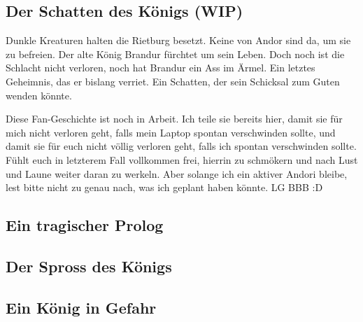 \begin{chapterbox}
    \chapter{Der Schatten des Königs (WIP)}
    \label{wip-der-schatten-des-koenigs}
    
    Dunkle Kreaturen halten die Rietburg besetzt. Keine  von Andor sind da, um sie zu befreien. Der alte König Brandur fürchtet um sein Leben. Doch noch ist die Schlacht nicht verloren, noch hat Brandur ein Ass im Ärmel. Ein letztes Geheimnis, das er bislang  verriet. Ein Schatten, der sein Schicksal zum Guten wenden könnte.
\end{chapterbox}



Diese Fan-Geschichte ist noch in Arbeit. Ich teile sie bereits hier, damit sie für mich nicht verloren geht, falls mein Laptop spontan verschwinden sollte, und damit sie für euch nicht völlig verloren geht, falls ich spontan verschwinden sollte. Fühlt euch in letzterem Fall vollkommen frei, hierrin zu schmökern und nach Lust und Laune weiter daran zu werkeln. Aber solange ich ein aktiver Andori bleibe, lest bitte nicht zu genau nach, was ich geplant haben könnte. LG BBB :D



\newpage
\section{Ein tragischer Prolog}









\newpage
\section{Der Spross des Königs}











\newpage
\section{Ein König in Gefahr}










